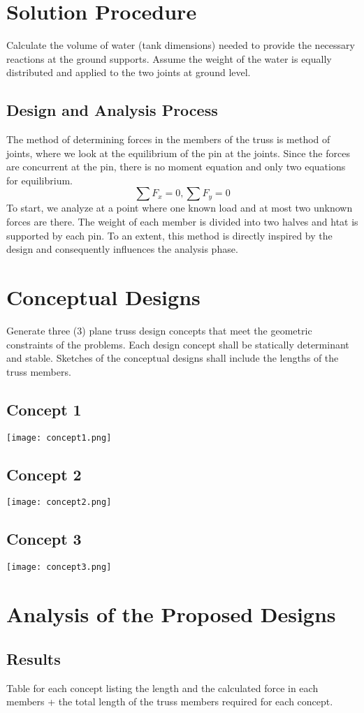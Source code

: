 \chapter{Solution Procedure}
Calculate the volume of water (tank dimensions) needed to provide the necessary reactions at the ground supports.
Assume the weight of the water is equally distributed and applied to the two joints at ground level.
\section{Design and Analysis Process}
The method of determining forces in the members of the truss is method of joints, where we look at the equilibrium of the pin at the joints. Since the forces are concurrent at the pin, there is no moment equation and only two equations for equilibrium.
$$ \sum F_{x} = 0, \sum F_{y} = 0 $$
To start, we analyze at a point where one known load and at most two unknown forces are there. The weight of each member is divided into two halves and htat is supported by each pin. To an extent, this method is directly inspired by the design and consequently influences the analysis phase. 
\chapter{Conceptual Designs}
Generate three (3) plane truss design concepts that meet the geometric constraints of the problems.
Each design concept shall be statically determinant and stable.
Sketches of the conceptual designs shall include the lengths of the truss members.
\section{Concept 1}
\texttt{[image: concept1.png]}
\section{Concept 2}
\texttt{[image: concept2.png]}
\section{Concept 3}
\texttt{[image: concept3.png]}

\chapter{Analysis of the Proposed Designs}
\section{Results}
Table for each concept listing the length and the calculated force in each members + the total length of the truss members required for each concept.

